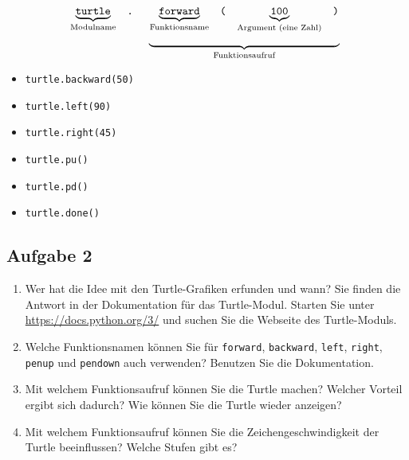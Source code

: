 $$
\begin{array}[t]{ccc} 
\underbrace{\textrm{\texttt{turtle}}}_{\textrm{Modulname}} & \texttt{.} & 
\begin{array}[t]{cccc} 
\underbrace{\textrm{\texttt{forward}}}_{\textrm{Funktionsname}} & \texttt{(} &\underbrace{\textrm{\texttt{100}}}_{\textrm{Argument (eine Zahl)}} & \texttt{)} \end{array} \\
 &  & \underbrace{\hspace{6cm}}_{\textrm{Funktionsaufruf}}
\end{array}
$$
\vspace{0.5cm}
\begin{itemize}
	\centering
	\item[] \lstinline{turtle.backward(50)}
	\vspace{1.75cm}
	\item[] \lstinline{turtle.left(90)}
	\vspace{1.75cm}
	\item[] \lstinline{turtle.right(45)}
	\vspace{1.75cm}
	\item[] \lstinline{turtle.pu()}
	\vspace{1.75cm}
	\item[] \lstinline{turtle.pd()}
	\vspace{1.75cm}
	\item[] \lstinline{turtle.done()}
	\vspace{1.75cm}
\end{itemize}

\subsection{Aufgabe 2}

\begin{enumerate}
	\item Wer hat die Idee mit den Turtle-Grafiken erfunden und wann? Sie finden die Antwort in der Dokumentation für das Turtle-Modul. Starten Sie unter \url{https://docs.python.org/3/} und suchen Sie die Webseite des Turtle-Moduls.
	\fillwithlines{0.5in}
	\item Welche Funktionsnamen können Sie für \lstinline{forward}, \lstinline{backward}, \lstinline{left}, \lstinline{right}, \lstinline{penup} und \lstinline{pendown} auch verwenden? Benutzen Sie die Dokumentation.
	\fillwithlines{0.5in}
	\item Mit welchem Funktionsaufruf können Sie die Turtle  machen? Welcher Vorteil ergibt sich dadurch? Wie können Sie die Turtle wieder anzeigen?
	\fillwithlines{1in}
	\item Mit welchem Funktionsaufruf können Sie die Zeichengeschwindigkeit der Turtle beeinflussen? Welche Stufen gibt es?
	\fillwithlines{1in}
\end{enumerate}

